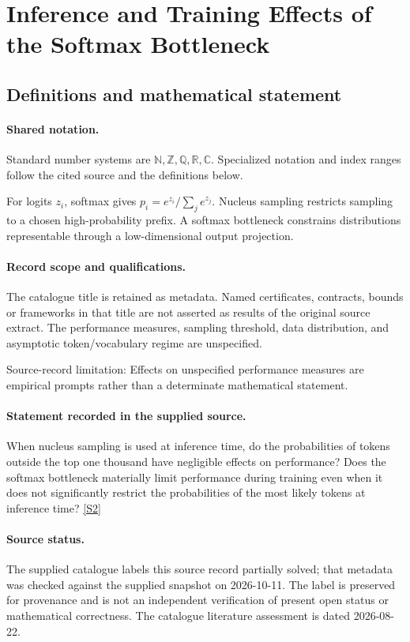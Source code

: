 \documentclass[11pt]{article}
\newcommand{\sref}[2]{\hyperlink{source:#1:#2}{[S#2]}}
\begin{document}
\section{Inference and Training Effects of the Softmax Bottleneck}\label{statement}

\subsection{Definitions and mathematical statement}

\paragraph{Shared notation.}Standard number systems are $\mathbb N,\mathbb Z,\mathbb Q,\mathbb R,\mathbb C$. Specialized notation and index ranges follow the cited source and the definitions below.


For logits $z_i$, softmax gives $p_i=e^{z_i}/\sum_j e^{z_j}$. Nucleus sampling restricts sampling to a chosen high-probability prefix. A softmax bottleneck constrains distributions representable through a low-dimensional output projection.
\paragraph{Record scope and qualifications.}
The catalogue title is retained as metadata. Named certificates, contracts, bounds or frameworks in that title are not asserted as results of the original source extract.
The performance measures, sampling threshold, data distribution, and asymptotic token/vocabulary regime are unspecified.

Source-record limitation: Effects on unspecified performance measures are empirical prompts rather than a determinate mathematical statement.
\paragraph{Statement recorded in the supplied source.}
When nucleus sampling is used at inference time, do the probabilities of tokens outside the top one thousand have negligible effects on performance? Does the softmax bottleneck materially limit performance during training even when it does not significantly restrict the probabilities of the most likely tokens at inference time? \sref{statement}{2}
\paragraph{Source status.}
The supplied catalogue labels this source record partially solved; that metadata was checked against the supplied snapshot on 2026-10-11. The label is preserved for provenance and is not an independent verification of present open status or mathematical correctness. The catalogue literature assessment is dated 2026-08-22.
\end{document}
